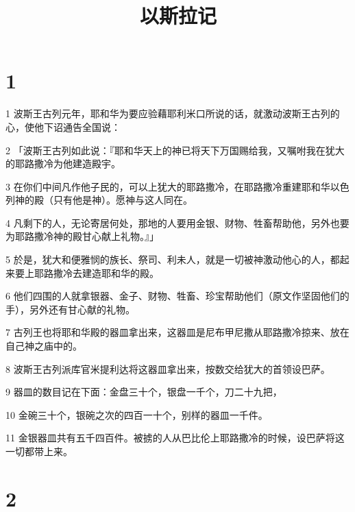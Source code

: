

\title{以斯拉记}


\chapter{1}

\par 1 波斯王古列元年，耶和华为要应验藉耶利米口所说的话，就激动波斯王古列的心，使他下诏通告全国说：
\par 2 「波斯王古列如此说：『耶和华天上的神已将天下万国赐给我，又嘱咐我在犹大的耶路撒冷为他建造殿宇。
\par 3 在你们中间凡作他子民的，可以上犹大的耶路撒冷，在耶路撒冷重建耶和华以色列神的殿（只有他是神）。愿神与这人同在。
\par 4 凡剩下的人，无论寄居何处，那地的人要用金银、财物、牲畜帮助他，另外也要为耶路撒冷神的殿甘心献上礼物。』」
\par 5 於是，犹大和便雅悯的族长、祭司、利未人，就是一切被神激动他心的人，都起来要上耶路撒冷去建造耶和华的殿。
\par 6 他们四围的人就拿银器、金子、财物、牲畜、珍宝帮助他们（原文作坚固他们的手），另外还有甘心献的礼物。
\par 7 古列王也将耶和华殿的器皿拿出来，这器皿是尼布甲尼撒从耶路撒冷掠来、放在自己神之庙中的。
\par 8 波斯王古列派库官米提利达将这器皿拿出来，按数交给犹大的首领设巴萨。
\par 9 器皿的数目记在下面：金盘三十个，银盘一千个，刀二十九把，
\par 10 金碗三十个，银碗之次的四百一十个，别样的器皿一千件。
\par 11 金银器皿共有五千四百件。被掳的人从巴比伦上耶路撒冷的时候，设巴萨将这一切都带上来。

\chapter{2}

